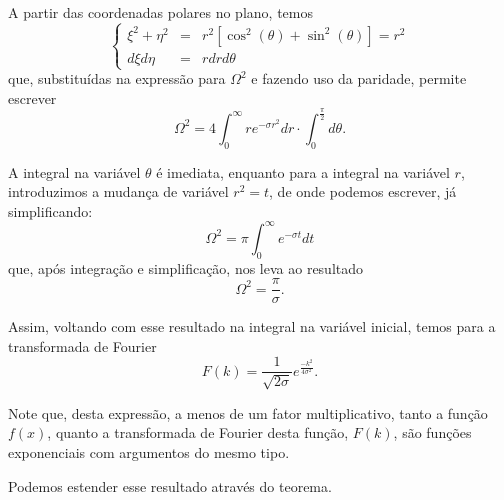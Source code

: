{A partir das coordenadas polares no plano, temos
$$\left\{
\begin{array}{rcl}
\xi^{2} + \eta^{2} &=& r^{2} [\cos^{2}(\theta) + \sin^{2}(\theta)] = r^{2} \\
d\xi d\eta &=& r dr d\theta
\end{array}\right.$$
que, substituídas na expressão para $\Omega^{2}$ e fazendo uso da
paridade, permite escrever
$$
\Omega^{2}
= 4
\int_{0}^{\infty}
r e^{-\sigma r^{2}} dr
\cdot
\int_{0}^{\frac{\pi}{2}}
d\theta.$$

A integral na variável $\theta$ é imediata, enquanto para a integral na variável $r$, introduzimos a mudança de variável $r^{2} = t$, de onde podemos escrever, já simplificando:
$$\Omega^{2} = \pi \int_{0}^{\infty} e^{-\sigma t} dt$$
que, após integração e simplificação, nos leva ao resultado
$$\Omega^{2} = \dfrac{\pi}{\sigma}.$$

Assim, voltando com esse resultado na integral na variável inicial, temos para a transformada de Fourier
$$F(k) = \dfrac{1}{\sqrt{2\sigma}} e^{\frac{-k^{2}}{4\sigma^{2}}}.$$

Note que, desta expressão, a menos de um fator multiplicativo, tanto a função $f(x)$, quanto a transformada de Fourier desta função, $F(k)$, são funções exponenciais com argumentos do mesmo tipo.
}




Podemos estender esse resultado através do teorema.




